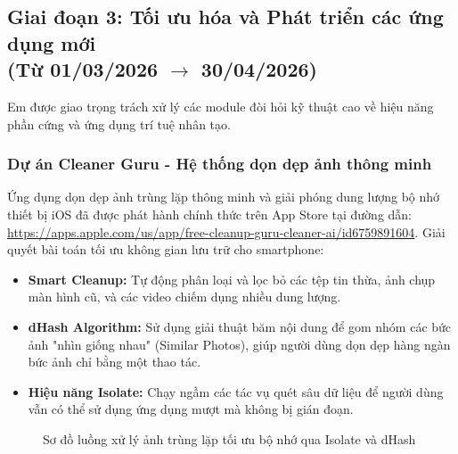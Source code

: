\documentclass[12pt, a4paper]{article}
\begin{document}
\subsection[Giai đoạn 3: Tối ưu hóa và Phát triển các ứng dụng mới (Từ 01/03/2026 đến 30/04/2026)]{Giai đoạn 3: Tối ưu hóa và Phát triển các ứng dụng mới \\(Từ 01/03/2026 $\rightarrow$ 30/04/2026)}
Em được giao trọng trách xử lý các module đòi hỏi kỹ thuật cao về hiệu năng phần cứng và ứng dụng trí tuệ nhân tạo.

\subsubsection{Dự án Cleaner Guru - Hệ thống dọn dẹp ảnh thông minh}
Ứng dụng dọn dẹp ảnh trùng lặp thông minh và giải phóng dung lượng bộ nhớ thiết bị iOS đã được phát hành chính thức trên App Store tại đường dẫn: \url{https://apps.apple.com/us/app/free-cleanup-guru-cleaner-ai/id6759891604}.
Giải quyết bài toán tối ưu không gian lưu trữ cho smartphone:
\begin{itemize}
    \item \textbf{Smart Cleanup:} Tự động phân loại và lọc bỏ các tệp tin thừa, ảnh chụp màn hình cũ, và các video chiếm dụng nhiều dung lượng.
    \item \textbf{dHash Algorithm:} Sử dụng giải thuật băm nội dung để gom nhóm các bức ảnh "nhìn giống nhau" (Similar Photos), giúp người dùng dọn dẹp hàng ngàn bức ảnh chỉ bằng một thao tác.
    \item \textbf{Hiệu năng Isolate:} Chạy ngầm các tác vụ quét sâu dữ liệu để người dùng vẫn có thể sử dụng ứng dụng mượt mà không bị gián đoạn.
\end{itemize}

\begin{figure}[htbp]
\centering
{}
\caption{Sơ đồ luồng xử lý ảnh trùng lặp tối ưu bộ nhớ qua Isolate và dHash}
\label{fig:dhash_flow}
\end{figure}
\end{document}

